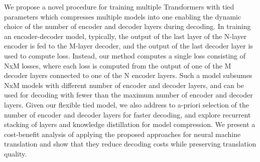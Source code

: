 We propose a novel procedure for training multiple Transformers with tied parameters which compresses multiple models into one enabling the dynamic choice of the number of encoder and decoder layers during decoding. In training an encoder-decoder model, typically, the output of the last layer of the N-layer encoder is fed to the M-layer decoder, and the output of the last decoder layer is used to compute loss. Instead, our method computes a single loss consisting of NxM losses, where each loss is computed from the output of one of the M decoder layers connected to one of the N encoder layers. Such a model subsumes NxM models with different number of encoder and decoder layers, and can be used for decoding with fewer than the maximum number of encoder and decoder layers. Given our flexible tied model, we also address to a-priori selection of the number of encoder and decoder layers for faster decoding, and explore recurrent stacking of layers and knowledge distillation for model compression. We present a cost-benefit analysis of applying the proposed approaches for neural machine translation and show that they reduce decoding costs while preserving translation quality.
